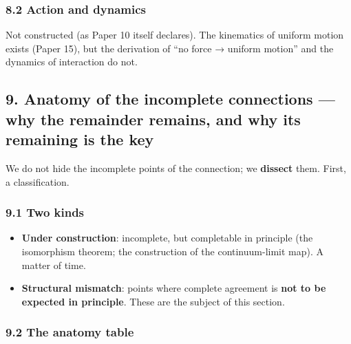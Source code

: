 \documentclass[
]{article}
\providecommand{\tightlist}{%
  \setlength{\itemsep}{0pt}\setlength{\parskip}{0pt}}
\begin{document}
\subsubsection{8.2 Action and dynamics}\label{action-and-dynamics}

Not constructed (as Paper 10 itself declares). The kinematics of uniform
motion exists (Paper 15), but the derivation of ``no force → uniform
motion'' and the dynamics of interaction do not.

\subsection{9. Anatomy of the incomplete connections --- why the
remainder remains, and why its remaining is the
key}\label{anatomy-of-the-incomplete-connections-why-the-remainder-remains-and-why-its-remaining-is-the-key}

We do not hide the incomplete points of the connection; we
\textbf{dissect} them. First, a classification.

\subsubsection{9.1 Two kinds}\label{two-kinds}

\begin{itemize}
\tightlist
\item
  \textbf{Under construction}: incomplete, but completable in principle
  (the isomorphism theorem; the construction of the continuum-limit
  map). A matter of time.
\item
  \textbf{Structural mismatch}: points where complete agreement is
  \textbf{not to be expected in principle}. These are the subject of
  this section.
\end{itemize}

\subsubsection{9.2 The anatomy table}\label{the-anatomy-table}
\end{document}
